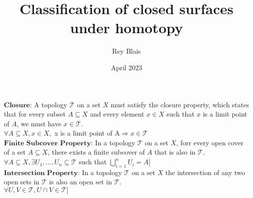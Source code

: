 \documentclass[12pt, letterpaper, twoside]{article}
\title{Classification of closed surfaces under homotopy}
\author{Rey Blais}
\date{April 2023}
\begin{document}
 
\maketitle

$\textbf{Closure:}$ A topology $\mathcal{T}$ on a set $X$ must satisfy the closure property, which states that for every subset $A \subseteq X$ and every element $x \in X$ such that $x$ is a limit point of $A$, we must have $x \in \mathcal{T}$. \\

$\forall A  \subseteq X, x \in X,$  x is a limit point of  A$ \Rightarrow x \in \mathcal{T}$ \\


$\textbf{Finite Subcover Property:}$ In a topology $\mathcal{T}$ on a set $X$, forr every open cover of a set $A \subseteq X$, there exists a finite subcover of $A$ that is also in $\mathcal{T}$. \\

$\forall A \subseteq X, \exists {U_1, \dots, U_n} \subseteq \mathcal{T}$  such that  $\bigcup_{i=1}^n U_i = A]$\\

$\textbf{Intersection Property:}$ In a topology $\mathcal{T}$ on a set $X$ the intersection of any two open sets in $\mathcal{T}$ is also an open set in $\mathcal{T}$. \\

$\forall U,V \in \mathcal{T}, U \cap V \in \mathcal{T}]$\\
\end{document}
